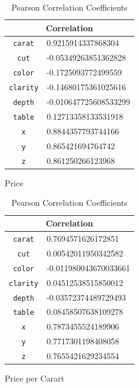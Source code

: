 \documentclass[11pt,letterpaper]{article}
\begin{document}
\begin{table}[H]
\begin{subtable}[H]{0.45\textwidth}
    \begin{tabular}{c l}
        \hline
        \multicolumn{2}{c}{Correlation}         \\
        \hline 
    \texttt{carat}   & 0.9215914337868304    \\
    \texttt{cut}     & -0.05349263851362828  \\
    \texttt{color}   & -0.1725093772499559   \\
    \texttt{clarity} & -0.14680175361025616  \\
    \texttt{depth}   & -0.010647725608533299 \\
    \texttt{table}   & 0.12713358133531918   \\
    \texttt{x}       & 0.8844357793744166    \\
    \texttt{y}       & 0.865421694764742     \\
    \texttt{z}       & 0.861250266123968    \\
    \end{tabular}
    \caption{Price}
    \end{subtable}
    \begin{subtable}[H]{0.45\textwidth}
        \begin{tabular}{c l}
            \hline
            \multicolumn{2}{c}{Correlation}         \\
            \hline 
        \texttt{carat}   & 0.7694571626172851    \\
        \texttt{cut}     & 0.00542011950342582   \\
        \texttt{color}   & -0.011980043670033661 \\
        \texttt{clarity} & 0.04512538515850012   \\
        \texttt{depth}   & -0.03572374489729493  \\
        \texttt{table}   & 0.08458507638109278   \\
        \texttt{x}       & 0.7873455524189906    \\
        \texttt{y}       & 0.7717301198408058    \\
        \texttt{z}       & 0.7655421629234554   \\
    
        \end{tabular}
        \caption{Price per Carart}
    \end{subtable}
    \caption{Pearson Correlation Coefficients}
\end{table}
\end{document}
